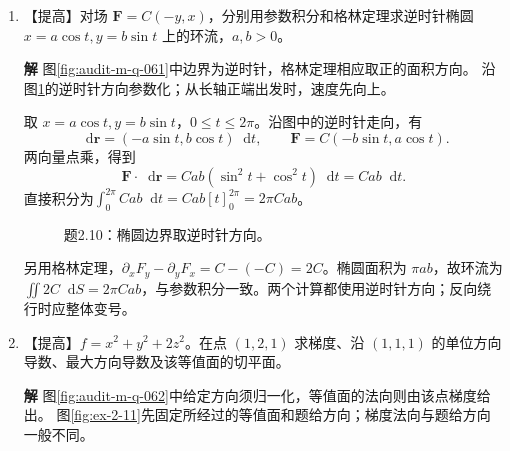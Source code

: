 \documentclass[11pt,openany,fontset=fandol]{ctexbook}
\theoremstyle{plain}\newtheorem{theorem}{定理}[chapter]\newtheorem{proposition}[theorem]{命题}
\theoremstyle{definition}\newtheorem{definition}{定义}[chapter]\newtheorem{example}{例}[chapter]
\theoremstyle{remark}\newtheorem*{remark}{说明}
\newcommand{\SolutionStart}{\par\nobreak\medskip\nobreak\noindent\textbf{解}\quad\ignorespaces}
\newenvironment{solution}{\SolutionStart}{\par\medskip}
\newcommand{\dd}{\mathop{}\!\mathrm d}\newcommand{\ii}{\mathrm i}\newcommand{\ee}{\mathrm e}
\newcommand{\vct}[1]{\bm{#1}}\newcommand{\Rea}{\operatorname{Re}}\newcommand{\Ima}{\operatorname{Im}}
\begin{document}
\begin{enumerate}[label=2.\arabic*]
\begin{solution}
所得加速度两分量的比例与图中的法向 $(-2ax,1)$ 相同；在顶点水平分量为零，竖直分量向上。
\end{solution}

\item \begin{minipage}[t]{\linewidth}
【提高】对场 $\vct F=C(-y,x)$，分别用参数积分和格林定理求逆时针椭圆 $x=a\cos t,y=b\sin t$ 上的环流，$a,b>0$。

\end{minipage}

\begin{solution}
图\ref{fig:audit-m-q-061}中边界为逆时针，格林定理相应取正的面积方向。
沿图\ref{fig:ex-2-10}的逆时针方向参数化；从长轴正端出发时，速度先向上。

取 $x=a\cos t,y=b\sin t$，$0\le t\le2\pi$。沿图中的逆时针走向，有
\[
\dd\vct r=(-a\sin t,b\cos t)\dd t,\qquad
\vct F=C(-b\sin t,a\cos t).
\]
两向量点乘，得到
\[
\vct F\cdot\dd\vct r=Cab(\sin^2t+\cos^2t)\dd t=Cab\dd t.
\]
直接积分为$\int_0^{2\pi}Cab\dd t=Cab[t]_0^{2\pi}=2\pi Cab$。

\begin{figure}[H]\centering
{}
\caption{题2.10：椭圆边界取逆时针方向。}\label{fig:ex-2-10}
\end{figure}

另用格林定理，$\partial_xF_y-\partial_yF_x=C-(-C)=2C$。椭圆面积为 $\pi ab$，故环流为 $\iint2C\dd S=2\pi Cab$，与参数积分一致。两个计算都使用逆时针方向；反向绕行时应整体变号。

\end{solution}

\item \begin{minipage}[t]{\linewidth}
【提高】$f=x^2+y^2+2z^2$。在点 $(1,2,1)$ 求梯度、沿 $(1,1,1)$ 的单位方向导数、最大方向导数及该等值面的切平面。

\end{minipage}

\begin{solution}
图\ref{fig:audit-m-q-062}中给定方向须归一化，等值面的法向则由该点梯度给出。
图\ref{fig:ex-2-11}先固定所经过的等值面和题给方向；梯度法向与题给方向一般不同。


\end{solution}
\end{enumerate}
\end{document}
